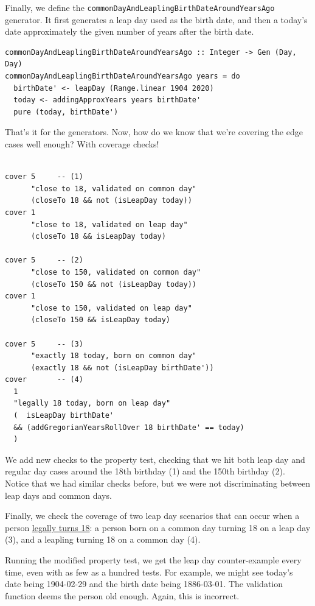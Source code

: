 Finally, we define the
\texttt{commonDayAndLeaplingBirthDateAroundYearsAgo} generator. It first
generates a leap day used as the birth date, and then a today's date
approximately the given number of years after the birth date.

\begin{verbatim}
commonDayAndLeaplingBirthDateAroundYearsAgo :: Integer -> Gen (Day, Day)
commonDayAndLeaplingBirthDateAroundYearsAgo years = do
  birthDate' <- leapDay (Range.linear 1904 2020)
  today <- addingApproxYears years birthDate'
  pure (today, birthDate')
\end{verbatim}
That's it for the generators. Now, how do we know that we're covering
the edge cases well enough? With coverage checks!

\begin{verbatim}

cover 5     -- (1)
      "close to 18, validated on common day"
      (closeTo 18 && not (isLeapDay today))
cover 1
      "close to 18, validated on leap day"
      (closeTo 18 && isLeapDay today)

cover 5     -- (2)
      "close to 150, validated on common day"
      (closeTo 150 && not (isLeapDay today))
cover 1
      "close to 150, validated on leap day"
      (closeTo 150 && isLeapDay today)

cover 5     -- (3)
      "exactly 18 today, born on common day"
      (exactly 18 && not (isLeapDay birthDate'))
cover       -- (4) 
  1
  "legally 18 today, born on leap day"
  (  isLeapDay birthDate'
  && (addGregorianYearsRollOver 18 birthDate' == today)
  )
\end{verbatim}
We add new checks to the property test, checking that we hit both leap
day and regular day cases around the 18th birthday (1) and the 150th
birthday (2). Notice that we had similar checks before, but we were not
discriminating between leap days and common days.

Finally, we check the coverage of two leap day scenarios that can occur
when a person
\href{https://en.wikipedia.org/wiki/February_29\#Legal_status}{legally
turns 18}: a person born on a common day turning 18 on a leap day (3),
and a leapling turning 18 on a common day (4).

Running the modified property test, we get the leap day counter-example
every time, even with as few as a hundred tests. For example, we might
see today's date being 1904-02-29 and the birth date being 1886-03-01.
The validation function deems the person old enough. Again, this is
incorrect.

